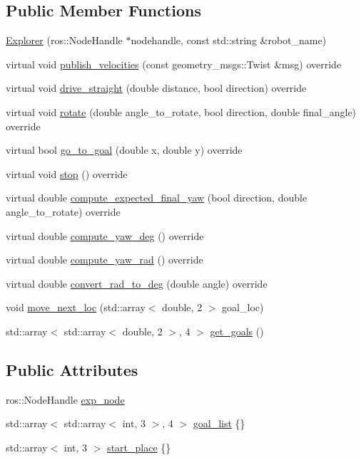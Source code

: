 \subsection*{Public Member Functions}
\begin{DoxyCompactItemize}
\item 
\hyperlink{class_explorer_aafe6b7c3b9c2e24815aa14a731f31890}{Explorer} (ros\+::\+Node\+Handle $\ast$nodehandle, const std\+::string \&robot\+\_\+name)
\item 
virtual void \hyperlink{class_explorer_a71d49e07fda9132640ef7ca560492065}{publish\+\_\+velocities} (const geometry\+\_\+msgs\+::\+Twist \&msg) override
\item 
virtual void \hyperlink{class_explorer_a38e04dc019525baca8530b6cf3e779de}{drive\+\_\+straight} (double distance, bool direction) override
\item 
virtual void \hyperlink{class_explorer_a2616a65bd251592f1b9f151546d429d8}{rotate} (double angle\+\_\+to\+\_\+rotate, bool direction, double final\+\_\+angle) override
\item 
virtual bool \hyperlink{class_explorer_aaf31add48ee079244fbdc7aaa574c72b}{go\+\_\+to\+\_\+goal} (double x, double y) override
\item 
virtual void \hyperlink{class_explorer_a44a5755de0e7a3934265a8f9ab4c9b2e}{stop} () override
\item 
virtual double \hyperlink{class_explorer_a5a445fc280b6fb133e1ce02e09920da2}{compute\+\_\+expected\+\_\+final\+\_\+yaw} (bool direction, double angle\+\_\+to\+\_\+rotate) override
\item 
virtual double \hyperlink{class_explorer_a9235375b60669fc046c41318759dc1dc}{compute\+\_\+yaw\+\_\+deg} () override
\item 
virtual double \hyperlink{class_explorer_abace49485da40310e567a77689bcb377}{compute\+\_\+yaw\+\_\+rad} () override
\item 
virtual double \hyperlink{class_explorer_a00f687c86ecf3de47a1b424a3b2e07ea}{convert\+\_\+rad\+\_\+to\+\_\+deg} (double angle) override
\item 
void \hyperlink{class_explorer_a2b0c1e46e1a17e99f4156edf5a93b691}{move\+\_\+next\+\_\+loc} (std\+::array$<$ double, 2 $>$ goal\+\_\+loc)
\item 
std\+::array$<$ std\+::array$<$ double, 2 $>$, 4 $>$ \hyperlink{class_explorer_a847e3ad2e7233d493a8dcfdd7139cb58}{get\+\_\+goals} ()
\end{DoxyCompactItemize}
\subsection*{Public Attributes}
\begin{DoxyCompactItemize}
\item 
ros\+::\+Node\+Handle \hyperlink{class_explorer_acfbbc5075675a523b7995d6c2db06eff}{exp\+\_\+node}
\item 
std\+::array$<$ std\+::array$<$ int, 3 $>$, 4 $>$ \hyperlink{class_explorer_acda1856f421dfe836f39de446415b969}{goal\+\_\+list} \{\}
\item 
std\+::array$<$ int, 3 $>$ \hyperlink{class_explorer_af1aee46522a58db39d3643f2138c76fa}{start\+\_\+place} \{\}
\end{DoxyCompactItemize}
